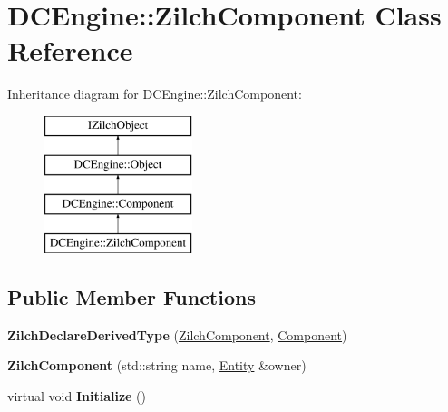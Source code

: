 \hypertarget{classDCEngine_1_1ZilchComponent}{\section{D\-C\-Engine\-:\-:Zilch\-Component Class Reference}
\label{classDCEngine_1_1ZilchComponent}
}
Inheritance diagram for D\-C\-Engine\-:\-:Zilch\-Component\-:\begin{figure}[H]
\begin{center}
\leavevmode
\includegraphics[height=4.000000cm]{classDCEngine_1_1ZilchComponent}
\end{center}
\end{figure}
\subsection*{Public Member Functions}
\begin{DoxyCompactItemize}
\item 
\hypertarget{classDCEngine_1_1ZilchComponent_acd6b16e03ef99b135a41187d138a3201}{{\bfseries Zilch\-Declare\-Derived\-Type} (\hyperlink{classDCEngine_1_1ZilchComponent}{Zilch\-Component}, \hyperlink{classDCEngine_1_1Component}{Component})}\label{classDCEngine_1_1ZilchComponent_acd6b16e03ef99b135a41187d138a3201}

\item 
\hypertarget{classDCEngine_1_1ZilchComponent_ad9ed4df8c55d7d82890c9d6f7c1092c1}{{\bfseries Zilch\-Component} (std\-::string name, \hyperlink{classDCEngine_1_1Entity}{Entity} \&owner)}\label{classDCEngine_1_1ZilchComponent_ad9ed4df8c55d7d82890c9d6f7c1092c1}

\item 
\hypertarget{classDCEngine_1_1ZilchComponent_ac9f939cdaab80f4e00f5877b323539da}{virtual void {\bfseries Initialize} ()}\label{classDCEngine_1_1ZilchComponent_ac9f939cdaab80f4e00f5877b323539da}

\end{DoxyCompactItemize}
